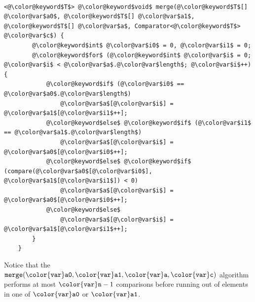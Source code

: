 \documentclass[10pt]{book}
\newcommand{\pcodeimport}[1]{}
\theoremstyle{plain}
\theoremstyle{definition}
\begin{document}
 \ \vspace{.5ex}\begin{Verbatim}[gobble=1,tabsize=2,frame=single,framerule=1.2pt,commandchars=\\@\$,label=\texttt{Algorithms},labelposition=topline]
	<@\color@keyword$T$> @\color@keyword$void$ merge(@\color@keyword$T$[] @\color@var$a0$, @\color@keyword$T$[] @\color@var$a1$, @\color@keyword$T$[] @\color@var$a$, Comparator<@\color@keyword$T$> @\color@var$c$) {
		@\color@keyword$int$ @\color@var$i0$ = 0, @\color@var$i1$ = 0;
		@\color@keyword$for$ (@\color@keyword$int$ @\color@var$i$ = 0; @\color@var$i$ < @\color@var$a$.@\color@var$length$; @\color@var$i$++) {
			@\color@keyword$if$ (@\color@var$i0$ == @\color@var$a0$.@\color@var$length$)
				@\color@var$a$[@\color@var$i$] = @\color@var$a1$[@\color@var$i1$++];
			@\color@keyword$else$ @\color@keyword$if$ (@\color@var$i1$ == @\color@var$a1$.@\color@var$length$)
				@\color@var$a$[@\color@var$i$] = @\color@var$a0$[@\color@var$i0$++];
			@\color@keyword$else$ @\color@keyword$if$ (compare(@\color@var$a0$[@\color@var$i0$], @\color@var$a1$[@\color@var$i1$]) < 0)
				@\color@var$a$[@\color@var$i$] = @\color@var$a0$[@\color@var$i0$++];
			@\color@keyword$else$ 
				@\color@var$a$[@\color@var$i$] = @\color@var$a1$[@\color@var$i1$++];
		}
	}
\end{Verbatim}

\pcodeimport{ods/Algorithms.merge(a0,a1,a)}
Notice that the \ensuremath{\mathtt{merge({\color{var}a0},{\color{var}a1},{\color{var}a},{\color{var}c})}} algorithm performs at most $\ensuremath{\mathtt{{\color{var}n}}}-1$
comparisons before running out of elements in one of \ensuremath{\mathtt{{\color{var}a0}}} or \ensuremath{\mathtt{{\color{var}a1}}}.
\end{document}
